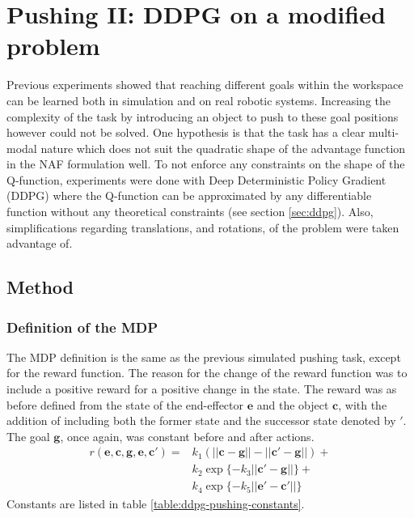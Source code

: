 \chapter{Pushing II: DDPG on a modified problem}

Previous experiments showed that reaching different goals within the workspace
can be learned both in simulation and on real robotic systems. Increasing the
complexity of the task by introducing an object to push to these goal positions
however could not be solved. One hypothesis is that the task has a clear
multi-modal nature which does not suit the quadratic shape of the advantage
function in the NAF formulation well. To not enforce any constraints on the
shape of the Q-function, experiments were done with Deep Deterministic Policy
Gradient (DDPG) where the Q-function can be approximated by any differentiable
function without any theoretical constraints (see section \ref{sec:ddpg}).
Also, simplifications regarding translations, and rotations, of the problem
were taken advantage of.

\section{Method}

\subsection{Definition of the MDP}

The MDP definition is the same as the previous simulated pushing task, except
for the reward function. The reason for the change of the reward function was
to include a positive reward for a positive change in the state.
The reward was as before defined from the state of the end-effector
$\mathbf{e}$ and the object $\mathbf{c}$, with the addition of including both
the former state and the successor state denoted by $'$. The goal $\mathbf{g}$,
once again, was constant before and after actions.
\begin{align*}
    r(\mathbf{e, c, g, e, c'}) = &k_1 \left(\mathbf{||c - g|| - ||c' - g||}\right) + \\
        &k_2 \exp \lbrace -k_3 ||\mathbf{c' - g}|| \rbrace + \\
        &k_4 \exp \lbrace -k_5||\mathbf{e' - c'}||\rbrace
\end{align*}
Constants are listed in table \ref{table:ddpg-pushing-constants}.

